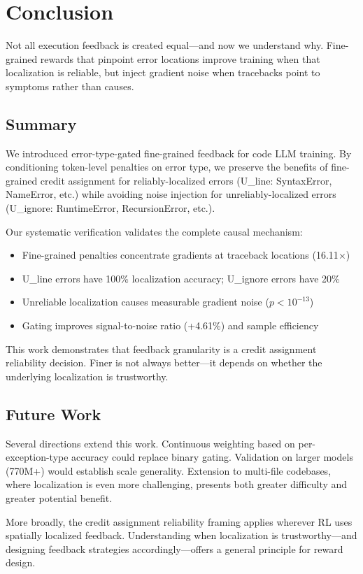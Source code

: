 \section{Conclusion}

Not all execution feedback is created equal---and now we understand why. Fine-grained rewards that pinpoint error locations improve training when that localization is reliable, but inject gradient noise when tracebacks point to symptoms rather than causes.

\subsection{Summary}

We introduced error-type-gated fine-grained feedback for code LLM training. By conditioning token-level penalties on error type, we preserve the benefits of fine-grained credit assignment for reliably-localized errors (U\_line: SyntaxError, NameError, etc.) while avoiding noise injection for unreliably-localized errors (U\_ignore: RuntimeError, RecursionError, etc.).

Our systematic verification validates the complete causal mechanism:
\begin{itemize}
\item Fine-grained penalties concentrate gradients at traceback locations (16.11$\times$)
\item U\_line errors have 100\% localization accuracy; U\_ignore errors have 20\%
\item Unreliable localization causes measurable gradient noise ($p<10^{-13}$)
\item Gating improves signal-to-noise ratio (+4.61\%) and sample efficiency
\end{itemize}

This work demonstrates that feedback granularity is a credit assignment reliability decision. Finer is not always better---it depends on whether the underlying localization is trustworthy.

\subsection{Future Work}

Several directions extend this work. Continuous weighting based on per-exception-type accuracy could replace binary gating. Validation on larger models (770M+) would establish scale generality. Extension to multi-file codebases, where localization is even more challenging, presents both greater difficulty and greater potential benefit.

More broadly, the credit assignment reliability framing applies wherever RL uses spatially localized feedback. Understanding when localization is trustworthy---and designing feedback strategies accordingly---offers a general principle for reward design.
